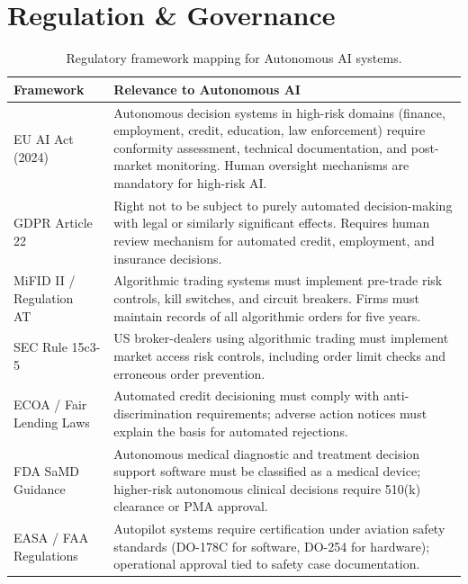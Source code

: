 \documentclass[12pt, a4paper]{article}
\begin{document}
\section{Regulation \& Governance}\label{sec:governance}

\begin{table}[ht]
\centering
\caption{Regulatory framework mapping for Autonomous AI systems.}
\label{tab:regulation}
\begin{tabular}{p{4cm}p{8cm}}
\toprule
\textbf{Framework} & \textbf{Relevance to Autonomous AI} \\
\midrule
EU AI Act (2024)~\citep{eu2024aiact}
  & Autonomous decision systems in high-risk domains (finance, employment, credit, education, law enforcement) require conformity assessment, technical documentation, and post-market monitoring. Human oversight mechanisms are mandatory for high-risk AI. \\
GDPR Article 22~\citep{eu2016gdpr}
  & Right not to be subject to purely automated decision-making with legal or similarly significant effects. Requires human review mechanism for automated credit, employment, and insurance decisions. \\
MiFID II / Regulation AT~\citep{mifid2014}
  & Algorithmic trading systems must implement pre-trade risk controls, kill switches, and circuit breakers. Firms must maintain records of all algorithmic orders for five years. \\
SEC Rule 15c3-5~\citep{sec2010}
  & US broker-dealers using algorithmic trading must implement market access risk controls, including order limit checks and erroneous order prevention. \\
ECOA / Fair Lending Laws~\citep{cfpb2023ecoa}
  & Automated credit decisioning must comply with anti-discrimination requirements; adverse action notices must explain the basis for automated rejections. \\
FDA SaMD Guidance~\citep{fda2019samd}
  & Autonomous medical diagnostic and treatment decision support software must be classified as a medical device; higher-risk autonomous clinical decisions require 510(k) clearance or PMA approval. \\
EASA / FAA Regulations
  & Autopilot systems require certification under aviation safety standards (DO-178C for software, DO-254 for hardware); operational approval tied to safety case documentation. \\
\bottomrule
\end{tabular}
\end{table}
\end{document}

